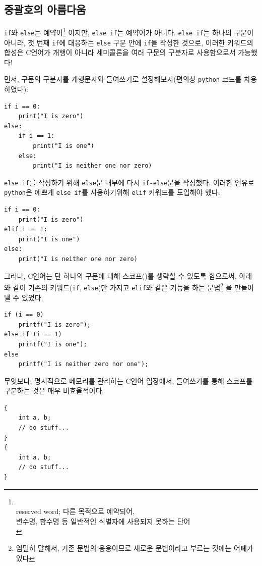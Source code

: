 \documentclass[a4paper,12pt]{book}
\newcommand{\V}[1]{\Verb|#1|}
\begin{document}
\begin{appendices}

\section{중괄호의 아름다움}
\label{sec:code-beauty}

\V{if}와 \V{else}는 예약어\footnote{ \\
    reserved word; 다른 목적으로 예약되어, \\
    변수명, 함수명 등 일반적인 식별자에 사용되지 못하는 단어 \\
}
이지만, \V{else if}는 예약어가 아니다.
\V{else if}는 하나의 구문이 아니라,
첫 번째 \V{if}에 대응하는 \V{else} 구문 안에 \V{if}을 작성한 것으로,
이러한 키워드의 합성은 C언어가 개행이 아니라 세미콜론을
여러 구문의 구분자로 사용함으로서 가능했다!

먼저, 구문의 구분자를 개행문자와 들여쓰기로 설정해보자(편의상 \V{python} 코드를 차용하였다):

\begin{lstlisting}
if i == 0:
    print("I is zero")
else:
    if i == 1:
        print("I is one")
    else:
        print("I is neither one nor zero)
\end{lstlisting}

\V{else if}를 작성하기 위해 \V{else}문 내부에 다시 \V{if-else}문을 작성했다.
이러한 연유로 \V{python}은 예쁘게 \V{else if}를 사용하기위해 \V{elif} 키워드를 도입해야 했다:

\begin{lstlisting}
if i == 0:
    print("I is zero")
elif i == 1:
    print("I is one")
else:
    print("I is neither one nor zero)
\end{lstlisting}

그러나, C언어는 단 하나의 구문에 대해 스코프({})를 생략할 수 있도록 함으로써,
아래와 같이 기존의 키워드(\V{if}, \V{else})만 가지고 \V{elif}와 같은 기능을 하는
문법\footnote{엄밀히 말해서, 기존 문법의 응용이므로 새로운 문법이라고 부르는 것에는 어폐가 있다}
을 만들어 낼 수 있었다.

\begin{lstlisting}
if (i == 0)
    printf("I is zero");
else if (i == 1)
    printf("I is one");
else
    printf("I is neither zero nor one");
\end{lstlisting}

무엇보다, 명시적으로 메모리를 관리하는 C언어 입장에서,
들여쓰기를 통해 스코프를 구분하는 것은 매우 비효율적이다.

\begin{lstlisting}
{
    int a, b;
    // do stuff...
}
{
    int a, b;
    // do stuff...
}
\end{lstlisting}


\end{appendices}
\end{document}
